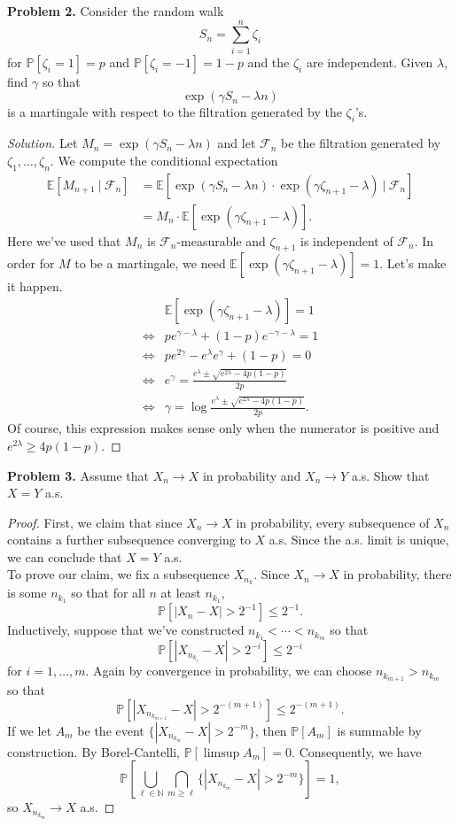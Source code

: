 \documentclass[11pt,letterpaper]{report}
\newcommand{\naturals}{\mathbb{N}}
\newcommand{\mcal}[1]{\mathcal{#1}}
\newcommand{\E}{\mathbb{E}}
\newcommand{\Prob}{\mathbb{P}}
\newenvironment{solution}
{\begin{proof}[Solution]}
{\end{proof}}
\begin{document}
\noindent\textbf{Problem 2. }
Consider the random walk
\[
S_n = \sum_{i=1}^n\zeta_i
\]
for $\Prob[\zeta_i=1] = p$ and $\Prob[\zeta_i = -1] = 1-p$ and the $\zeta_i$ are independent. Given $\lambda$, find $\gamma$ so that
\[
\exp(\gamma S_n - \lambda n)
\]
is a martingale with respect to the filtration generated by the $\zeta_i$'s.
\begin{solution}
	Let $M_n = \exp(\gamma S_n - \lambda n)$ and let $\mcal{F}_n$ be the filtration generated by $\zeta_1, \ldots, \zeta_n$. We compute the conditional expectation
	\begin{align*}
		\E[M_{n+1}\ |\ \mcal{F}_n] &= \E[\exp(\gamma S_n - \lambda n)\cdot \exp(\gamma \zeta_{n+1}-\lambda)\ |\ \mcal{F}_n]\\
		&= M_n\cdot \E[\exp(\gamma\zeta_{n+1}-\lambda)].
	\end{align*}
	Here we've used that $M_n$ is $\mcal{F}_n$-measurable and $\zeta_{n+1}$ is independent of $\mcal{F}_n$. In order for $M$ to be a martingale, we need $\E[\exp(\gamma \zeta_{n+1}-\lambda)] = 1$. Let's make it happen.
	\begin{align*}
		&\E[\exp(\gamma\zeta_{n+1}-\lambda)] = 1\\
		\iff & pe^{\gamma-\lambda} + (1-p)e^{-\gamma-\lambda} = 1\\
		\iff & pe^{2\gamma} - e^{\lambda}e^{\gamma} + (1-p) = 0\\
		\iff & e^{\gamma} = \frac{e^\lambda \pm \sqrt{e^{2\lambda}-4p(1-p)}}{2p}\\
		\iff & \gamma = \log \frac{e^\lambda \pm \sqrt{e^{2\lambda}-4p(1-p)}}{2p}.
	\end{align*}
	Of course, this expression makes sense only when the numerator is positive and $e^{2\lambda}\geq 4p(1-p)$.
\end{solution}


\noindent\textbf{Problem 3. }
Assume that $X_n\to X$ in probability and $X_n\to Y$ a.s. Show that $X=Y$ a.s.
\begin{proof}
	First, we claim that since $X_n\to X$ in probability, every subsequence of $X_n$ contains a further subsequence converging to $X$ a.s. Since the a.s. limit is unique, we can conclude that $X = Y$ a.s.\\

	\noindent To prove our claim, we fix a subsequence $X_{n_k}$. Since $X_n\to X$ in probability, there is some $n_{k_1}$ so that for all $n$ at least $n_{k_1}$,
	\[
	\Prob[|X_n-X|>2^{-1}] \leq 2^{-1}.
	\]
	Inductively, suppose that we've constructed $n_{k_1} < \cdots < n_{k_m}$ so that
	\[
	\Prob[|X_{n_{k_i}}-X|>2^{-i}] \leq 2^{-i}
	\]
	for $i = 1, \ldots, m$. Again by convergence in probability, we can choose $n_{k_{m+1}}>n_{k_m}$ so that
	\[
	\Prob[|X_{n_{k_{m+1}}}-X|>2^{-(m+1)}]\leq 2^{-(m+1)}.
	\]
	If we let $A_m$ be the event $\{|X_{n_{k_m}}-X| > 2^{-m}\}$, then $\Prob[A_m]$ is summable by construction. By Borel-Cantelli, $\Prob[\limsup A_m] = 0$. Consequently, we have
	\[
	\Prob\left[\bigcup_{\ell\in \naturals}\bigcap_{m\geq \ell}\{|X_{n_{k_m}}-X|>2^{-m}\}\right] = 1,
	\]
	so $X_{n_{k_m}}\to X$ a.s.
\end{proof}
\end{document}
